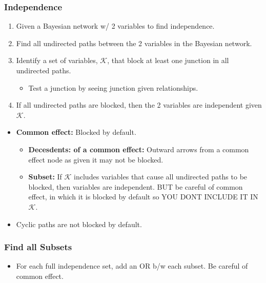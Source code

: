 \subsubsection{Independence}
\begin{process}
    \begin{enumerate}
        \item Given a Bayesian network w/ 2 variables to find independence.
        \item Find all undirected paths between the 2 variables in the Bayesian network.
        \item Identify a set of variables, $\mathcal{K}$, that block at least one junction in all undirected paths.
        \begin{itemize}
            \item Test a junction by seeing junction given relationships. 
        \end{itemize}
        \item If all undirected paths are blocked, then the 2 variables are independent given $\mathcal{K}$.
    \end{enumerate}
\end{process}

\begin{warning}
    \begin{itemize}
        \item \textbf{Common effect:} Blocked by default. 
        \begin{itemize}
            \item \textbf{Decesdents: of a common effect:} Outward arrows from a common effect node as given it may not be blocked.
            \item \textbf{Subset:} If $\mathcal{K}$ includes variables that cause all undirected paths to be blocked, then variables are independent. BUT be careful of common effect, in which it is blocked by default so YOU DONT INCLUDE IT IN $\mathcal{K}$.
        \end{itemize}
        \item Cyclic paths are not blocked by default.
    \end{itemize}
\end{warning}

\subsubsection{Find all Subsets}
\begin{notes}
    \begin{itemize}
        \item For each full independence set, add an OR b/w each subset. Be careful of common effect. 
    \end{itemize}
\end{notes}
\newpage 

